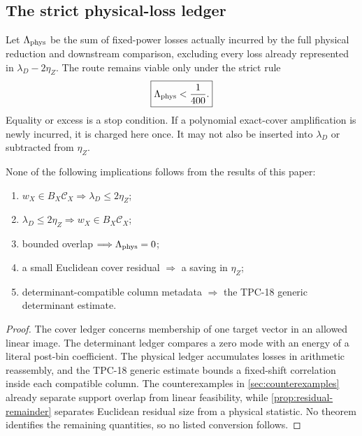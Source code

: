\subsection{The strict physical-loss ledger}

Let \(\Lambda_{\mathrm{phys}}\) be the sum of fixed-power losses actually
incurred by the full physical reduction and downstream comparison,
excluding every loss already represented in
\(\lambda_D-2\eta_Z\).  The route remains viable only under the strict
rule
\begin{equation}
 \boxed{\Lambda_{\mathrm{phys}}<\frac1{400}.}
 \label{eq:physical-loss-ledger}
\end{equation}
Equality or excess is a stop condition.  If a polynomial
exact-cover amplification is newly incurred, it is charged here once.
It may not also be inserted into \(\lambda_D\) or subtracted from
\(\eta_Z\).

\begin{theorem}
\label{thm:no-ledger-conversion}
None of the following implications follows from the results of this
paper:
\begin{enumerate}[label=(\roman*),leftmargin=2.2em]
\item \(w_X\in B_X\mathscr C_X
  \Longrightarrow\lambda_D\le2\eta_Z\);
\item \(\lambda_D\le2\eta_Z
  \Longrightarrow w_X\in B_X\mathscr C_X\);
\item bounded overlap
  \(\Longrightarrow\Lambda_{\mathrm{phys}}=0\);
\item a small Euclidean cover residual
  \(\Longrightarrow\) a saving in \(\eta_Z\);
\item determinant-compatible column metadata
  \(\Longrightarrow\) the TPC-18 generic determinant estimate.
\end{enumerate}
\end{theorem}

\begin{proof}
The cover ledger concerns membership of one target vector in an
allowed linear image.  The determinant ledger compares a zero mode
with an energy of a literal post-bin coefficient.  The physical
ledger accumulates losses in arithmetic reassembly, and the TPC-18
generic estimate bounds a fixed-shift correlation inside each
compatible column.  The counterexamples in
\cref{sec:counterexamples} already separate support overlap from
linear feasibility, while \cref{prop:residual-remainder} separates
Euclidean residual size from a physical statistic.  No theorem
identifies the remaining quantities, so no listed conversion follows.
\end{proof}

